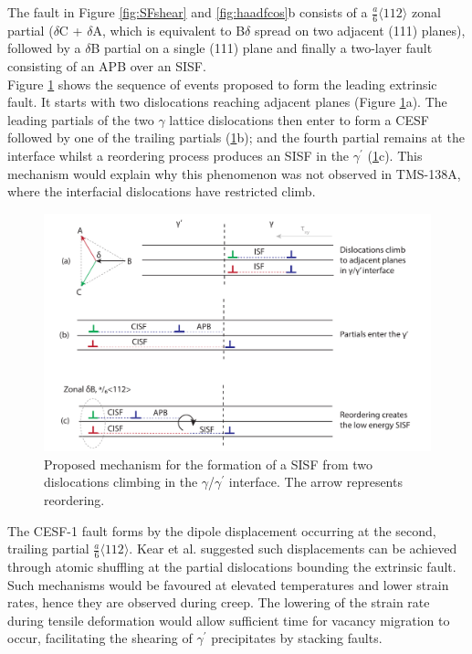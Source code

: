 \documentclass[a4paper,12pt,times,numbered,print,index]{Classes/PhDThesisPSnPDF}
\begin{document}
The fault in Figure \ref{fig:SFshear} and \ref{fig:haadfcos}b consists of a $\frac{a}{6}\langle112\rangle$ zonal partial ($\delta$C + $\delta$A, which is equivalent to B$\delta$ spread on two adjacent (111) planes), followed by a $\delta$B partial on a single (111) plane and finally a two-layer fault consisting of an APB over an SISF.\\
Figure \ref{fig:CESF_mech} shows the sequence of events proposed to form the leading extrinsic fault. It starts with two dislocations reaching adjacent planes (Figure \ref{fig:CESF_mech}a). The leading partials of the two $\gamma$ lattice dislocations then enter to form a CESF followed by one of the trailing partials (\ref{fig:CESF_mech}b); and the fourth partial remains at the interface whilst a reordering process produces an SISF in the $\gamma^\prime$ (\ref{fig:CESF_mech}c). This mechanism would explain why this phenomenon was not observed in TMS-138A, where the interfacial dislocations have restricted climb.\\
\begin{figure}
\includegraphics[width=\linewidth, keepaspectratio]{Figures/CESF_mech2_schem.pdf}
\caption{{Proposed mechanism for the f}ormation of a SISF from two dislocations climbing in the $\gamma$/$\gamma^\prime$ interface. The arrow represents reordering.}
\label{fig:CESF_mech}
\end{figure}
The CESF-1 fault forms by the dipole displacement occurring at the second, trailing partial $\frac{a}{6}\langle112\rangle$. Kear et al. suggested such displacements can be achieved through atomic shuffling at the partial dislocations bounding the extrinsic fault. Such mechanisms would be favoured at elevated temperatures and lower strain rates, hence they are observed during creep. The lowering of the strain rate during tensile deformation would allow sufficient time for vacancy migration to occur, facilitating the shearing of $\gamma^\prime$ precipitates by stacking faults.\\
\end{document}
